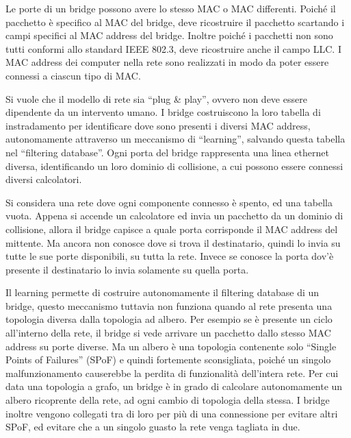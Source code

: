 \documentclass{article}
\numberwithin{equation}{subsection}
\begin{document}
Le porte di un bridge possono avere lo stesso MAC o MAC differenti. Poiché il pacchetto è specifico al MAC del bridge, deve ricostruire il pacchetto scartando i campi 
specifici al MAC address del bridge. Inoltre poiché i pacchetti non sono tutti conformi allo standard IEEE 802.3, deve ricostruire anche il campo LLC. I MAC address 
dei computer nella rete sono realizzati in modo da poter essere connessi a ciascun tipo di MAC. 


Si vuole che il modello di rete sia ``plug \& play'', ovvero non deve essere dipendente da un intervento umano. 
I bridge costruiscono la loro tabella di instradamento per identificare dove sono presenti i diversi MAC address, autonomamente attraverso un meccanismo di ``learning'', 
salvando questa tabella nel ``filtering database''. Ogni porta del bridge rappresenta una linea ethernet diversa, identificando un loro dominio di collisione, a cui 
possono essere connessi diversi calcolatori. 

Si considera una rete dove ogni componente connesso è spento, ed una tabella vuota. Appena si accende un calcolatore ed invia un pacchetto da un dominio di collisione, 
allora il bridge capisce a quale porta corrisponde il MAC address del mittente. Ma ancora non conosce dove si trova il destinatario, quindi lo invia su tutte le sue 
porte disponibili, su tutta la rete. Invece se conosce la porta dov'è presente il destinatario lo invia solamente su quella porta. 


Il learning permette di costruire autonomamente il filtering database di un bridge, questo meccanismo tuttavia non funziona quando al rete presenta una topologia diversa 
dalla topologia ad albero. Per esempio se è presente un ciclo all'interno della rete, il bridge si vede arrivare un pacchetto dallo stesso MAC address su porte diverse. 
Ma un albero è una topologia contenente solo ``Single Points of Failures'' (SPoF) e quindi fortemente sconsigliata, poiché un singolo malfunzionamento causerebbe la 
perdita di funzionalità dell'intera rete. Per cui data una topologia a grafo, un bridge è in grado di calcolare autonomamente un albero 
ricoprente della rete, ad ogni cambio di topologia della stessa. I bridge inoltre vengono collegati tra di loro per più di una connessione per evitare altri SPoF, ed 
evitare che a un singolo guasto la rete venga tagliata in due. 
\end{document}
